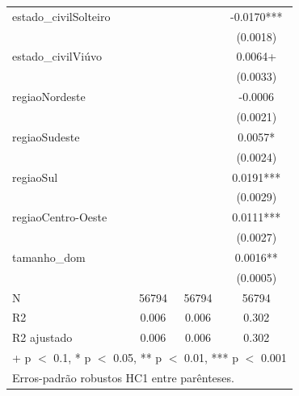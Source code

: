 \begin{table}
\begin{tabular}[t]{lccc}
estado\_civilSolteiro &  &  & -0.0170***\\
 &  &  & (0.0018)\\
estado\_civilViúvo &  &  & 0.0064+\\
 &  &  & (0.0033)\\
regiaoNordeste &  &  & -0.0006\\
 &  &  & (0.0021)\\
regiaoSudeste &  &  & 0.0057*\\
 &  &  & (0.0024)\\
regiaoSul &  &  & 0.0191***\\
 &  &  & (0.0029)\\
regiaoCentro-Oeste &  &  & 0.0111***\\
 &  &  & (0.0027)\\
tamanho\_dom &  &  & 0.0016**\\
 &  &  & (0.0005)\\
\midrule
N & 56794 & 56794 & 56794\\
R2 & 0.006 & 0.006 & 0.302\\
R2 ajustado & 0.006 & 0.006 & 0.302\\
\bottomrule
\multicolumn{4}{l}{\rule{0pt}{1em}+ p $<$ 0.1, * p $<$ 0.05, ** p $<$ 0.01, *** p $<$ 0.001}\\
\multicolumn{4}{l}{\rule{0pt}{1em}Erros-padrão robustos HC1 entre parênteses.}\\
\end{tabular}
\end{table}
